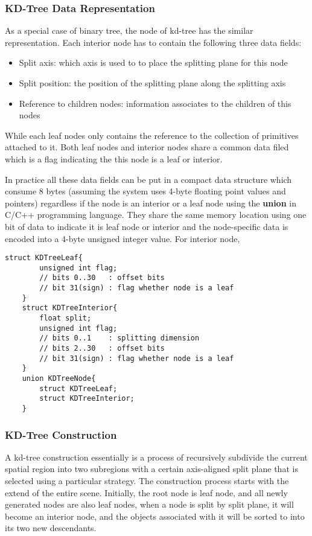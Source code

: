 \subsubsection{KD-Tree Data Representation}
As a special case of binary tree, the node of kd-tree has the similar representation. Each interior node has to contain the following three data fields: 
\begin{itemize}\itemsep1pt
	\item{Split axis: which axis is used to to place the splitting plane for this node}
	\item{Split position: the position of the splitting plane along the splitting axis}
	\item{Reference to children nodes: information associates to the children of this nodes}
\end{itemize}
While each leaf nodes only contains the reference to the collection of primitives attached to it. Both leaf nodes and interior nodes share a common data filed which is a flag indicating the this node is a leaf or interior. 

In practice all these data fields can be put in a compact data structure which consume 8 bytes (assuming the system uses 4-byte floating point values and pointers) regardless if the node is an interior or a leaf node using the \textbf{union} in C/C++ programming language. They share the same memory location using one bit of data to indicate it is leaf node or interior and the node-specific data is encoded into a 4-byte unsigned integer value. For interior node, 

\begin{lstlisting}[caption=Data layout of kd-tree node, label=lst:kd-tree_node]
	struct KDTreeLeaf{
		unsigned int flag; 
		// bits 0..30  	: offset bits
		// bit 31(sign) : flag whether node is a leaf  
	}
	struct KDTreeInterior{
		float split; 
		unsigned int flag; 
		// bits 0..1 	: splitting dimension
		// bits 2..30 	: offset bits
		// bit 31(sign) : flag whether node is a leaf
	}
	union KDTreeNode{ 		
		struct KDTreeLeaf;
		struct KDTreeInterior; 
	}
\end{lstlisting}

\subsubsection{KD-Tree Construction}
\label{subsubsec:kd-tree_construction}
A kd-tree construction essentially is a process of recursively subdivide the current spatial region into two subregions with a certain axis-aligned split plane that is selected using a particular strategy. The construction process starts with the extend of the entire scene. Initially, the root node is leaf node, and all newly generated nodes are also leaf nodes, when a node is split by split plane, it will become an interior node, and the objects associated with it will be sorted to into its two new descendants. 

